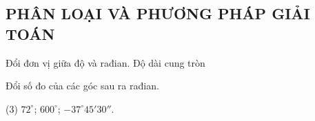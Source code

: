 \subsection{PHÂN LOẠI VÀ PHƯƠNG PHÁP GIẢI TOÁN}
\begin{dang}{Đổi đơn vị giữa độ và rađian. Độ dài cung tròn}
\end{dang}

\begin{vd}
	Đổi số đo của các góc sau ra rađian.
	\begin{tasks}(3)
		\task $72^\circ$;
		\task $600^\circ$;
		\task $-37^\circ45'30''$.
	\end{tasks}
\end{vd} %

